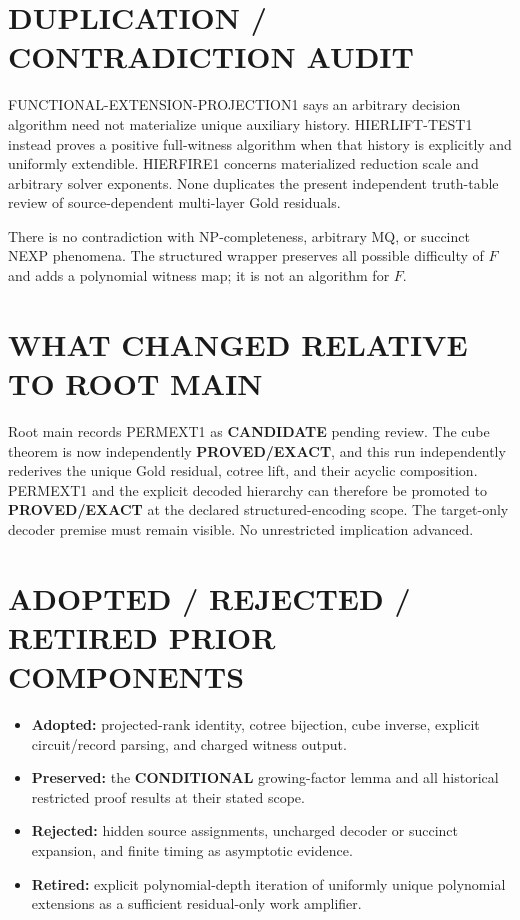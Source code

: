 \documentclass[11pt]{article}
\newcommand{\EXACT}{\textbf{PROVED/EXACT}}
\newcommand{\COND}{\textbf{CONDITIONAL}}
\newcommand{\CAND}{\textbf{CANDIDATE}}
\begin{document}
\section{DUPLICATION / CONTRADICTION AUDIT}
FUNCTIONAL-EXTENSION-PROJECTION1 says an arbitrary decision algorithm need
not materialize unique auxiliary history.  HIERLIFT-TEST1 instead proves a
positive full-witness algorithm when that history is explicitly and
uniformly extendible.  HIERFIRE1 concerns materialized reduction scale and
arbitrary solver exponents.  None duplicates the present independent
truth-table review of source-dependent multi-layer Gold residuals.

There is no contradiction with NP-completeness, arbitrary MQ, or succinct
NEXP phenomena.  The structured wrapper preserves all possible difficulty
of $F$ and adds a polynomial witness map; it is not an algorithm for $F$.

\section{WHAT CHANGED RELATIVE TO ROOT MAIN}
Root main records PERMEXT1 as \CAND{} pending review.  The cube theorem is now
independently \EXACT{}, and this run independently rederives the unique
Gold residual, cotree lift, and their acyclic composition.  PERMEXT1 and the
explicit decoded hierarchy can therefore be promoted to \EXACT{} at the
declared structured-encoding scope.  The target-only decoder premise must
remain visible.  No unrestricted implication advanced.

\section{ADOPTED / REJECTED / RETIRED PRIOR COMPONENTS}
\begin{itemize}
\item \textbf{Adopted:} projected-rank identity, cotree bijection, cube
inverse, explicit circuit/record parsing, and charged witness output.
\item \textbf{Preserved:} the \COND{} growing-factor lemma and all historical
restricted proof results at their stated scope.
\item \textbf{Rejected:} hidden source assignments, uncharged decoder or
succinct expansion, and finite timing as asymptotic evidence.
\item \textbf{Retired:} explicit polynomial-depth iteration of uniformly
unique polynomial extensions as a sufficient residual-only work amplifier.
\end{itemize}
\end{document}
